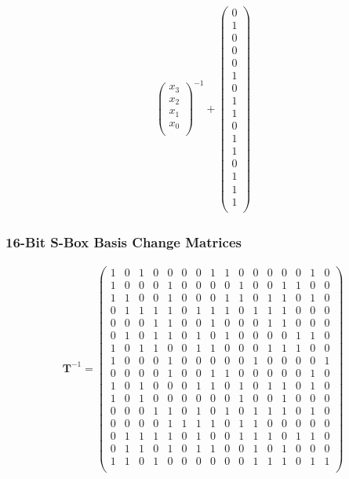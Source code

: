 \documentclass[handout,10pt]{beamer}
\begin{document}
\begin{frame}
\begin{align*}
\begin{pmatrix}
x_{3} \\
x_{2} \\
x_{1} \\
x_{0} \\
\end{pmatrix}^{-1}
+
\begin{pmatrix}
0 \\
1 \\
0 \\
0 \\
0 \\ 
1 \\
0 \\
1 \\
1 \\
0 \\
1 \\
1 \\
0 \\ 
1 \\
1 \\
1 \\
\end{pmatrix}
\end{align*}
\normalsize
\end{frame}

\begin{frame}
	\frametitle{16-Bit S-Box Basis Change Matrices}
\small
\begin{align*}
\mathbf{T}^{-1} = 
\begin{pmatrix}
1 &0 &1 &0 &0 &0 &0 &1 &1 &0 &0 &0 &0 &0 &1 &0\\
1 &0 &0 &0 &1 &0 &0 &0 &0 &1 &0 &0 &1 &1 &0 &0\\
1 &1 &0 &0 &1 &0 &0 &0 &1 &1 &0 &1 &1 &0 &1 &0\\
0 &1 &1 &1 &1 &0 &1 &1 &1 &0 &1 &1 &1 &0 &0 &0\\
0 &0 &0 &1 &1 &0 &0 &1 &0 &0 &0 &1 &1 &0 &0 &0\\
0 &1 &0 &1 &1 &0 &1 &0 &1 &0 &0 &0 &0 &1 &1 &0\\
1 &0 &1 &1 &0 &0 &1 &1 &0 &0 &0 &1 &1 &1 &0 &0\\
1 &0 &0 &0 &1 &0 &0 &0 &0 &0 &1 &0 &0 &0 &0 &1\\
0 &0 &0 &0 &1 &0 &0 &1 &1 &0 &0 &0 &0 &0 &1 &0\\
1 &0 &1 &0 &0 &0 &1 &1 &0 &1 &0 &1 &1 &0 &1 &0\\
1 &0 &1 &0 &0 &0 &0 &0 &0 &1 &0 &0 &1 &0 &0 &0\\
0 &0 &0 &1 &1 &0 &1 &0 &1 &0 &1 &1 &1 &0 &1 &0\\
0 &0 &0 &0 &1 &1 &1 &1 &0 &1 &1 &0 &0 &0 &0 &0\\
0 &1 &1 &1 &1 &0 &1 &0 &0 &1 &1 &1 &0 &1 &1 &0\\
0 &1 &1 &0 &1 &0 &1 &1 &0 &0 &1 &0 &1 &0 &0 &0\\
1 &1 &0 &1 &0 &0 &0 &0 &0 &0 &1 &1 &1 &0 &1 &1\\
\end{pmatrix}
\end{align*}
\normalsize
\end{frame}
\end{document}
